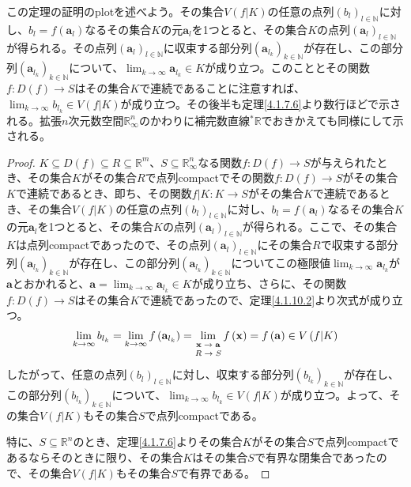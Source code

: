 \documentclass[dvipdfmx]{jsarticle}
\begin{document}
この定理の証明のplotを述べよう。その集合$V\left( f|K \right)$の任意の点列$\left( b_{l} \right)_{l \in \mathbb{N}}$に対し、$b_{l} = f\left( \mathbf{a}_{l} \right)$なるその集合$K$の元$\mathbf{a}_{l}$を1つとると、その集合$K$の点列$\left( \mathbf{a}_{l} \right)_{l \in \mathbb{N}}$が得られる。その点列$\left( \mathbf{a}_{l} \right)_{l \in \mathbb{N}}$に収束する部分列$\left( \mathbf{a}_{l_{k}} \right)_{k \in \mathbb{N}}$が存在し、この部分列$\left( \mathbf{a}_{l_{k}} \right)_{k \in \mathbb{N}}$について、$\lim_{k \rightarrow \infty}\mathbf{a}_{l_{k}} \in K$が成り立つ。このこととその関数$f:D(f) \rightarrow S$はその集合$K$で連続であることに注意すれば、$\lim_{k \rightarrow \infty}b_{l_{k}} \in V\left( f|K \right)$が成り立つ。その後半も定理\ref{4.1.7.6}より数行ほどで示される。拡張$n$次元数空間$\mathbb{R}_{\infty}^{n}$のかわりに補完数直線${}^{*}\mathbb{R}$でおきかえても同様にして示される。
\begin{proof}
$K \subseteq D(f) \subseteq R \subseteq \mathbb{R}^{m}$、$S \subseteq \mathbb{R}_{\infty}^{n}$なる関数$f:D(f) \rightarrow S$が与えられたとき、その集合$K$がその集合$R$で点列compactでその関数$f:D(f) \rightarrow S$がその集合$K$で連続であるとき、即ち、その関数$f|K:K \rightarrow S$がその集合$K$で連続であるとき、その集合$V\left( f|K \right)$の任意の点列$\left( b_{l} \right)_{l \in \mathbb{N}}$に対し、$b_{l} = f\left( \mathbf{a}_{l} \right)$なるその集合$K$の元$\mathbf{a}_{l}$を1つとると、その集合$K$の点列$\left( \mathbf{a}_{l} \right)_{l \in \mathbb{N}}$が得られる。ここで、その集合$K$は点列compactであったので、その点列$\left( \mathbf{a}_{l} \right)_{l \in \mathbb{N}}$にその集合$R$で収束する部分列$\left( \mathbf{a}_{l_{k}} \right)_{k \in \mathbb{N}}$が存在し、この部分列$\left( \mathbf{a}_{l_{k}} \right)_{k \in \mathbb{N}}$についてこの極限値$\lim_{k \rightarrow \infty}\mathbf{a}_{l_{k}}$が$\mathbf{a}$とおかれると、$\mathbf{a} = \lim_{k \rightarrow \infty}\mathbf{a}_{l_{k}} \in K$が成り立ち、さらに、その関数$f:D(f) \rightarrow S$はその集合$K$で連続であったので、定理\ref{4.1.10.2}より次式が成り立つ。
\begin{align*}
\lim_{k \rightarrow \infty}b_{l_{k}} = \lim_{k \rightarrow \infty}{f\left( \mathbf{a}_{l_{k}} \right)} = \lim_{\scriptsize \begin{matrix}
\mathbf{x} \rightarrow \mathbf{a} \\
R \rightarrow S \\
\end{matrix}}{f\left( \mathbf{x} \right)} = f\left( \mathbf{a} \right) \in V\left( f|K \right)
\end{align*}
したがって、任意の点列$\left( b_{l} \right)_{l \in \mathbb{N}}$に対し、収束する部分列$\left( b_{l_{k}} \right)_{k \in \mathbb{N}}$が存在し、この部分列$\left( b_{l_{k}} \right)_{k \in \mathbb{N}}$について、$\lim_{k \rightarrow \infty}b_{l_{k}} \in V\left( f|K \right)$が成り立つ。よって、その集合$V\left( f|K \right)$もその集合$S$で点列compactである。\par
特に、$S \subseteq \mathbb{R}^{n}$のとき、定理\ref{4.1.7.6}よりその集合$K$がその集合$S$で点列compactであるならそのときに限り、その集合$K$はその集合$S$で有界な閉集合であったので、その集合$V\left( f|K \right)$もその集合$S$で有界である。
\end{proof}
\end{document}
